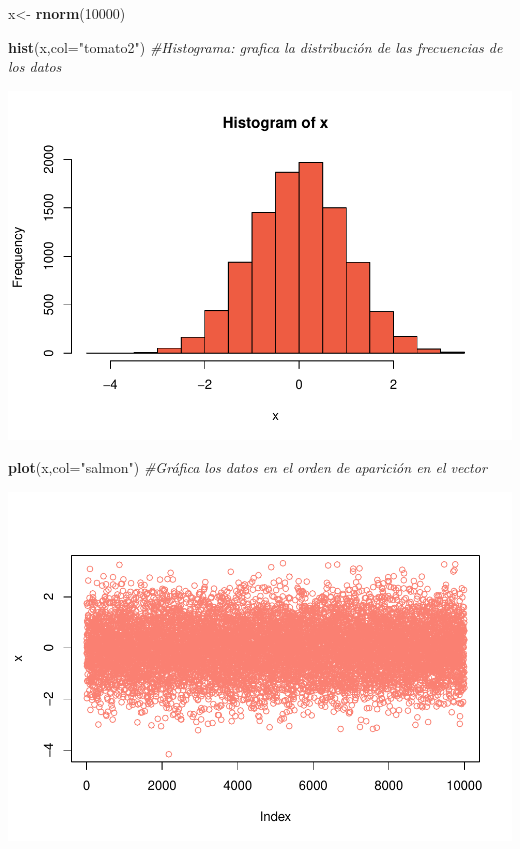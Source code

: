 \documentclass[
]{book}
\newenvironment{Shaded}{\begin{snugshade}}{\end{snugshade}}
\newcommand{\AttributeTok}[1]{\textcolor[rgb]{0.13,0.29,0.53}{#1}}
\newcommand{\CommentTok}[1]{\textcolor[rgb]{0.56,0.35,0.01}{\textit{#1}}}
\newcommand{\DecValTok}[1]{\textcolor[rgb]{0.00,0.00,0.81}{#1}}
\newcommand{\FunctionTok}[1]{\textcolor[rgb]{0.13,0.29,0.53}{\textbf{#1}}}
\newcommand{\NormalTok}[1]{#1}
\newcommand{\OtherTok}[1]{\textcolor[rgb]{0.56,0.35,0.01}{#1}}
\newcommand{\StringTok}[1]{\textcolor[rgb]{0.31,0.60,0.02}{#1}}
\begin{document}
\begin{Shaded}
\begin{Highlighting}[]
\NormalTok{x}\OtherTok{\textless{}{-}} \FunctionTok{rnorm}\NormalTok{(}\DecValTok{10000}\NormalTok{)}

\FunctionTok{hist}\NormalTok{(x,}\AttributeTok{col=}\StringTok{"tomato2"}\NormalTok{) }\CommentTok{\#Histograma: grafica la distribución de las frecuencias de los datos }
\end{Highlighting}
\end{Shaded}

\includegraphics{bookdown-demo_files/figure-latex/unnamed-chunk-76-1.pdf}

\begin{Shaded}
\begin{Highlighting}[]
\FunctionTok{plot}\NormalTok{(x,}\AttributeTok{col=}\StringTok{"salmon"}\NormalTok{) }\CommentTok{\#Gráfica los datos en el orden de aparición en el vector }
\end{Highlighting}
\end{Shaded}

\includegraphics{bookdown-demo_files/figure-latex/unnamed-chunk-76-2.pdf}
\end{document}
